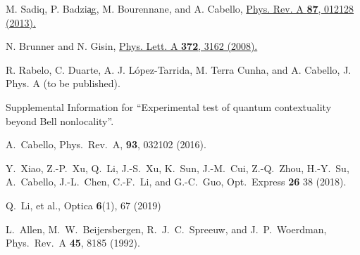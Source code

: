 \documentclass[pra,letterpaper,english,preprint,nofootinbib,aps,superscriptaddress,showkeys]{revtex4-1}
\theoremstyle{definition}
\theoremstyle{remark}
\begin{document}
\begin{thebibliography}{10}
 M. Sadiq, P. Badzi{\c a}g, M. Bourennane, and A. Cabello,
 \href{http://pra.aps.org/abstract/PRA/v87/i1/e012128}{Phys. Rev. A \textbf{87}, 012128 (2013).}





 N. Brunner and N. Gisin,
 \href{http://dx.doi.org/10.1016/j.physleta.2008.01.052}{Phys. Lett. A \textbf{372}, 3162 (2008).}

 R. Rabelo, C. Duarte, A. J. L\'opez-Tarrida, M. Terra Cunha, and A. Cabello,
 J. Phys. A (to be published).

 Supplemental Information for ``Experimental test of quantum contextuality beyond Bell nonlocality''.

 A.~Cabello,
 Phys.~Rev.~A, \textbf{93}, 032102 (2016).

 Y.~Xiao, Z.-P.~Xu, Q.~Li, J.-S.~Xu, K.~Sun, J.-M.~Cui, Z.-Q.~Zhou, H.-Y.~Su, A.~Cabello, J.-L.~Chen, C.-F.~Li, and G.-C.~Guo,
 Opt.~Express \textbf{26} 38 (2018).
 
 Q.~Li, et al.,
 Optica \textbf{6}(1), 67 (2019)


 L.~Allen, M.~W.~Beijersbergen, R.~J.~C.~Spreeuw, and J.~P.~Woerdman,
 Phys.~Rev.~A \textbf{45}, 8185 (1992).








\end{thebibliography}
\end{document}
